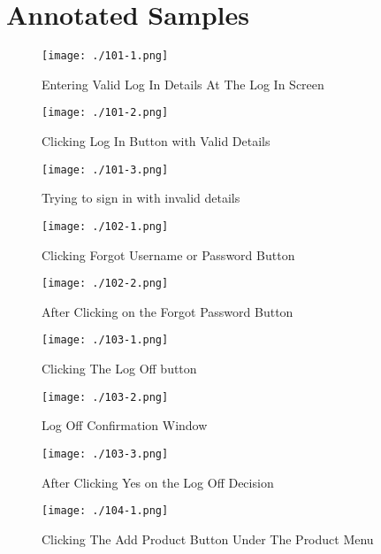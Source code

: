\section{Annotated Samples}

\begin{figure}[H]
    \texttt{[image: ./101-1.png]}
    \caption{Entering Valid Log In Details At The Log In Screen} \label{fig:101-1}
\end{figure}

\begin{figure}[H]
    \texttt{[image: ./101-2.png]}
    \caption{Clicking Log In Button with Valid Details} \label{fig:101-2}
\end{figure}

\begin{figure}[H]
    \texttt{[image: ./101-3.png]}
    \caption{Trying to sign in with invalid details} \label{fig:101-3}
\end{figure}

\begin{figure}[H]
    \texttt{[image: ./102-1.png]}
    \caption{Clicking Forgot Username or Password Button} \label{fig:102-1}
\end{figure}

\begin{figure}[H]
    \texttt{[image: ./102-2.png]}
    \caption{After Clicking on the Forgot Password Button } \label{fig:102-2}
\end{figure}

\begin{figure}[H]
    \texttt{[image: ./103-1.png]}
    \caption{Clicking The Log Off button} \label{fig:103-1}
\end{figure}

\begin{figure}[H]
    \texttt{[image: ./103-2.png]}
    \caption{Log Off Confirmation Window} \label{fig:103-2}
\end{figure}

\begin{figure}[H]
    \texttt{[image: ./103-3.png]}
    \caption{After Clicking Yes on the Log Off Decision} \label{fig:103-3}
\end{figure}

\begin{figure}[H]
    \texttt{[image: ./104-1.png]}
    \caption{Clicking The Add Product Button Under The Product Menu} \label{fig:104-1}
\end{figure}

